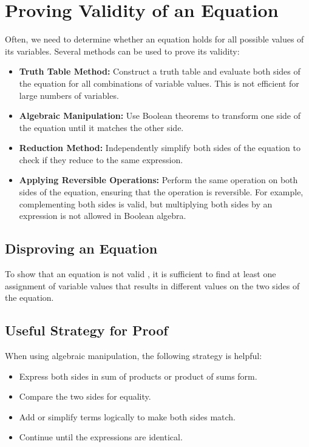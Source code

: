\section{Proving Validity of an Equation}

Often, we need to determine whether an equation holds for all possible values of its variables. Several methods can be used to prove its validity:

\begin{itemize}
    \item \textbf{Truth Table Method:} Construct a truth table and evaluate both sides of the equation for all combinations of variable values. This is not efficient for large numbers of variables.
    \item \textbf{Algebraic Manipulation:} Use Boolean theorems to transform one side of the equation until it matches the other side.
    \item \textbf{Reduction Method:} Independently simplify both sides of the equation to check if they reduce to the same expression.
    \item \textbf{Applying Reversible Operations:} Perform the same operation on both sides of the equation, ensuring that the operation is reversible. For example, complementing both sides is valid, but multiplying both sides by an expression is not allowed in Boolean algebra.
\end{itemize}

\subsection{Disproving an Equation}
To show that an equation is \color{blue} not valid \color{black}, it is sufficient to find at least one assignment of variable values that results in different values on the two sides of the equation.

\subsection{Useful Strategy for Proof}
When using algebraic manipulation, the following strategy is helpful:

\begin{itemize}
    \item Express both sides in \color{blue} sum of products \color{black} or \color{blue} product of sums \color{black} form.
    \item Compare the two sides for equality.
    \item Add or simplify terms logically to make both sides match.
    \item Continue until the expressions are identical.
\end{itemize}

